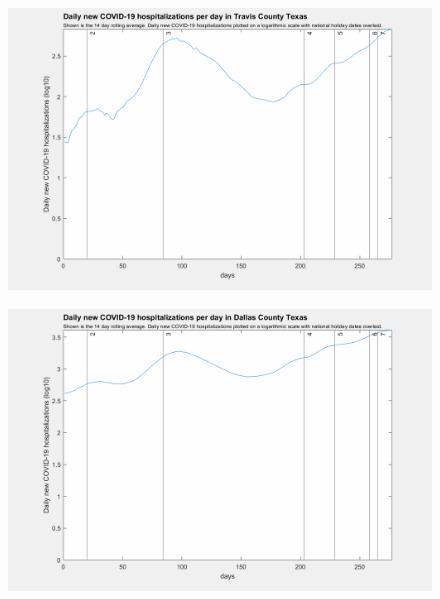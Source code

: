 \documentclass[]{article}
\begin{document}
\begin{figure}[!h]
	\includegraphics[width=\linewidth]{images/travis_hospitalizations_holiday_log.png}
	\caption{}
	\label{fig:images/travis_hospitalizations_holiday_logLabel}
\end{figure}

\begin{figure}[!h]
	\includegraphics[width=\linewidth]{images/dallas_hospitalizations_holiday_log.png}
	\caption{}
	\label{fig:images/dallas_hospitalizations_holiday_logLabel}
\end{figure}
\end{document}
